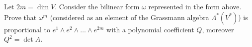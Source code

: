 \documentclass[12pt]{article}
\begin{document}
\begin{ukazanie}
Let $2m= \dim V$.
Consider the bilinear form $\omega$ represented in the form
above. Prove that  $\omega^{m}$ (considered as an element of the
Grassmann algebra $\Lambda^*(V^*)$) is proportional to  $e^1\wedge e^2\wedge \dots \wedge e^{2m}$
with a polynomial coefficient  $Q$, moreover $Q^2 = \det A$.
\end{ukazanie}
\end{document}
